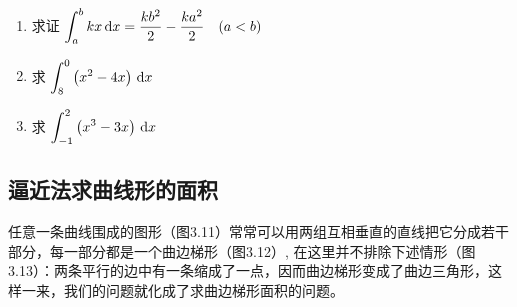 \begin{ex}
\begin{enumerate}
    \item 求证 $\displaystyle\int_{a}^{b} k x\,{\rm d} x=\dfrac{k b^{2}}{2}-\dfrac{k a^{2}}{2} \quad(a<b)$
    \item  求 $\displaystyle\int_{8}^{0}\left(x^{2}-4 x\right) \,{\rm d} x$
    \item  求 $\displaystyle\int_{-1}^{2}\left(x^{3}-3 x\right) \,{\rm d} x$
\end{enumerate}
\end{ex}

\subsection{逼近法求曲线形的面积}

任意一条曲线围成的图形（图3.11）常常可以用两组互相垂直的直线把它分成若干部分，每一部分都是一个曲边梯形（图3.12）, 在这里并不排除下述情形（图3.13）：两条平行的边中有一条缩成了一点，因而曲边梯形变成了曲边三角形，这样一来，我们的问题就化成了求曲边梯形面积的问题。



\begin{example}
    
\end{example}


\begin{solution}
    
\end{solution}


\begin{example}
    

\end{example}    
\begin{example}
    

\end{example}
\begin{example}
    

\end{example}    
\begin{example}
    

\end{example}
\begin{example}
    

\end{example}    
\begin{example}
    

\end{example}
\begin{example}
    

\end{example}    
\begin{example}
    

\end{example}



















